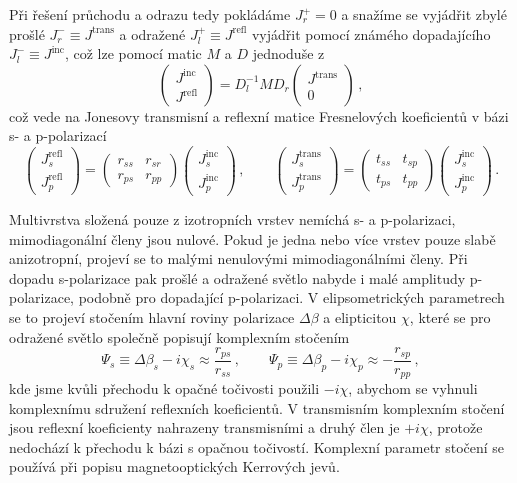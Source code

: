 Při řešení průchodu a odrazu tedy pokládáme $J^+_r=0$ a snažíme se vyjádřit zbylé prošlé $J^-_r \equiv J^\text{trans}$ a odražené $J^+_l \equiv J^\textrm{refl}$ vyjádřit pomocí známého dopadajícího $J^-_l\equiv J^\textrm{inc}$, což lze pomocí matic $M$ a $D$ jednoduše z
\begin{equation}
\begin{pmatrix} J^\textrm{inc} \\ J^\textrm{refl} \end{pmatrix}
=D_l^{-1} M D_r \begin{pmatrix}
J^\text{trans} \\ 0
\end{pmatrix} \,,
\end{equation}
což vede na Jonesovy transmisní a reflexní matice Fresnelových koeficientů v bázi s- a p-polarizací
\begin{equation}
\begin{pmatrix} J^\textrm{refl}_s \\ J^\textrm{refl}_p \end{pmatrix}
=\begin{pmatrix}
r_{ss} & r_{sr} \\ r_{ps} & r_{pp}
\end{pmatrix}
\begin{pmatrix} J^\textrm{inc}_s \\ J^\textrm{inc}_p \end{pmatrix} \,, \qquad
\begin{pmatrix} J^\textrm{trans}_s \\ J^\textrm{trans}_p \end{pmatrix}
=\begin{pmatrix}
t_{ss} & t_{sp} \\ t_{ps} & t_{pp}
\end{pmatrix}
\begin{pmatrix} J^\textrm{inc}_s \\ J^\textrm{inc}_p \end{pmatrix} \,.
\end{equation}

Multivrstva složená pouze z izotropních vrstev nemíchá s- a p-polarizaci, mimodiagonální členy jsou nulové.
Pokud je jedna nebo více vrstev pouze slabě anizotropní, projeví se to malými nenulovými mimodiagonálními členy.
Při dopadu s-polarizace pak prošlé a odražené světlo nabyde i malé amplitudy p-polarizace, podobně pro dopadající p-polarizaci.
V elipsometrických parametrech se to projeví stočením hlavní roviny polarizace $\Delta \beta$ a elipticitou $\chi$, které se pro odražené světlo společně popisují komplexním stočením \cite{Silber}
\begin{equation}\label{e:komplexni rotace}
\Psi_s \equiv \Delta \beta_s - i \chi_s \approx \frac{r_{ps}}{r_{ss}} \,, \qquad \Psi_p \equiv \Delta \beta_p - i \chi_p \approx -\frac{r_{sp}}{r_{pp}} \,,
\end{equation}
kde jsme kvůli přechodu k opačné točivosti použili $-i\chi$, abychom se vyhnuli komplexnímu sdružení reflexních koeficientů.
V transmisním komplexním stočení jsou reflexní koeficienty nahrazeny transmisními a druhý člen je $+i\chi$, protože nedochází k přechodu k bázi s opačnou točivostí.
Komplexní parametr stočení se používá při popisu magnetooptických Kerrových jevů.
